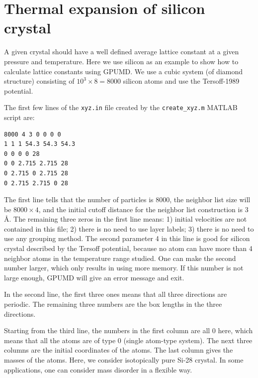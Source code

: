 \documentclass[12pt,a4paper]{report}
\begin{document}
\section{Thermal expansion of silicon crystal}


A given crystal should have a well defined average lattice constant at a given pressure and temperature. Here we use silicon as an example to show how to calculate lattice constants using GPUMD. We use a cubic system (of diamond structure) consisting of $10^3\times 8 = 8000$ silicon atoms and use the Tersoff-1989 potential.

The first few lines of the \verb"xyz.in" file created by the \verb"create_xyz.m" MATLAB script are:
\begin{verbatim}
8000 4 3 0 0 0 0
1 1 1 54.3 54.3 54.3
0 0 0 0 28
0 0 2.715 2.715 28
0 2.715 0 2.715 28
0 2.715 2.715 0 28
\end{verbatim}
The first line tells that the number of particles is 8000, the neighbor list size will be
$8000\times 4$, and the initial cutoff distance for the neighbor list construction is 3 \AA. The remaining three zeros in the first line means: 1) initial velocities are not contained in this file; 2) there is no need to use layer labels; 3) there is no need to use any grouping method. The second parameter 4 in this line is good for silicon crystal described by the Tersoff potential, because no atom can have more than 4 neighbor atoms in the temperature range studied. One can make the second number larger, which only results in using more memory. If this number is not large enough, GPUMD will give an error message and exit. 

In the second line, the first three ones means that all three directions are periodic. The remaining three numbers are the box lengths in the three directions. 

Starting from the third line, the numbers in the first column are all 0 here, which means that all the atoms are of type 0 (single atom-type system). The next three columns are the initial coordinates of the atoms. The last column gives the masses of the atoms. Here, we consider isotopically pure Si-28 crystal. In some applications, one can consider mass disorder in a flexible way.
\end{document}
